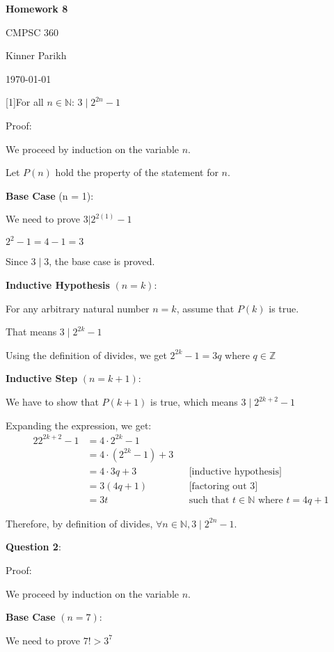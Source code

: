\documentclass{article} %
\newcommand{\question}[2][]{\begin{flushleft}
        \textbf{Question #1}: \text{#2}

\end{flushleft}}
\newcommand{\maketitletwo}[2][]{\begin{center}
        \Large{\textbf{Homework #1}
            
            CMPSC 360} %
        \vspace{5pt}
        
        \normalsize{Kinner Parikh  %
        
        \today}        %
        \vspace{15pt}
        
\end{center}}
\begin{document}
    \maketitletwo[8]  %
    
    \question[1]{For all $n \in \mathbb{N}$: $3 \mid 2^{2n} - 1$}

    Proof:

    We proceed by induction on the variable $n$.
    
    Let $P(n)$ hold the property of the statement for $n$.

    \textbf{Base Case} (n = 1):

    We need to prove $3 | 2^{2(1)} - 1$

    $2 ^ 2 - 1 = 4 - 1 = 3$

    Since $3 \mid 3$, the base case is proved.

    \textbf{Inductive Hypothesis} $(n = k)$:

    For any arbitrary natural number $n = k$, assume that $P(k)$ is true.

    That means $3 \mid 2^{2k} - 1$

    Using the definition of divides, we get $2^{2k} - 1 = 3q$ where $q \in \mathbb{Z}$

    \textbf{Inductive Step} $(n = k + 1)$:

    We have to show that $P(k + 1)$ is true, which means $3 \mid 2^{2k + 2} - 1$

    Expanding the expression, we get:
    \begin{alignat*}{2}
        2^{2k + 2} - 1 &= 4 \cdot 2^{2k} - 1 \\
        &= 4 \cdot (2^{2k} - 1) + 3 \\
        &= 4 \cdot 3q + 3 && \text{[inductive hypothesis]}\\
        &= 3(4q + 1) && \text{[factoring out 3]}\\
        &= 3t && \text{such that $t \in \mathbb{N}$ where $t = 4q + 1$}
    \end{alignat*}

    Therefore, by definition of divides, $\forall n \in \mathbb{N}, 3 \mid 2^{2n} - 1$.

    \newpage

    \question[2]{Show that $n! > 3^n$ for $n \geq 7$}

    Proof: 

    We proceed by induction on the variable $n$.

    \textbf{Base Case} $(n = 7)$:

    We need to prove $7! > 3^7$
\end{document}
